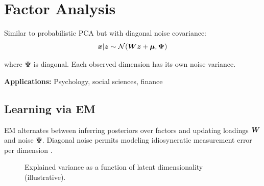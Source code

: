
\section{Factor Analysis}
\label{sec:factor-analysis}

Similar to probabilistic PCA but with diagonal noise covariance:
\begin{equation}
\boldsymbol{x} | \boldsymbol{z} \sim \mathcal{N}(\boldsymbol{W}\boldsymbol{z} + \boldsymbol{\mu}, \boldsymbol{\Psi})
\end{equation}

where $\boldsymbol{\Psi}$ is diagonal. Each observed dimension has its own noise variance.

\textbf{Applications:} Psychology, social sciences, finance

\subsection{Learning via EM}

EM alternates between inferring posteriors over factors and updating loadings $\boldsymbol{W}$ and noise $\boldsymbol{\Psi}$. Diagonal noise permits modeling idiosyncratic measurement error per dimension \textcite{Bishop2006}.

\begin{figure}[h]
  \centering
  \caption{Explained variance as a function of latent dimensionality (illustrative).}
  \label{fig:fa-variance}
\end{figure}

